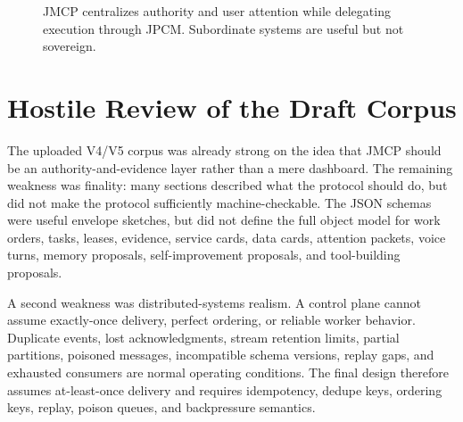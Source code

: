 \documentclass[10pt,journal,onecolumn]{IEEEtran}
\begin{document}
\begin{figure}[t]
\centering
{}
\caption{JMCP centralizes authority and user attention while delegating execution through JPCM. Subordinate systems are useful but not sovereign.}
\label{fig:architecture}
\end{figure}

\section{Hostile Review of the Draft Corpus}
The uploaded V4/V5 corpus was already strong on the idea that JMCP should be an authority-and-evidence layer rather than a mere dashboard. The remaining weakness was finality: many sections described what the protocol should do, but did not make the protocol sufficiently machine-checkable. The JSON schemas were useful envelope sketches, but did not define the full object model for work orders, tasks, leases, evidence, service cards, data cards, attention packets, voice turns, memory proposals, self-improvement proposals, and tool-building proposals.

A second weakness was distributed-systems realism. A control plane cannot assume exactly-once delivery, perfect ordering, or reliable worker behavior. Duplicate events, lost acknowledgments, stream retention limits, partial partitions, poisoned messages, incompatible schema versions, replay gaps, and exhausted consumers are normal operating conditions. The final design therefore assumes at-least-once delivery and requires idempotency, dedupe keys, ordering keys, replay, poison queues, and backpressure semantics.
\end{document}
